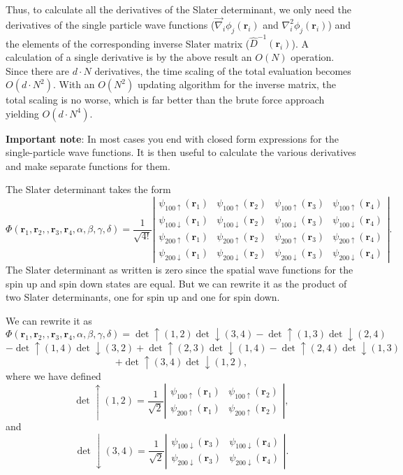 \documentclass[%
oneside,                 %
final,                   %
10pt]{article}
\begin{document}
Thus, to calculate all the derivatives of the Slater determinant, we
only need the derivatives of the single particle  wave functions
($\vec\nabla_i \phi_j(\mathbf{r}_i)$ and $\nabla^2_i \phi_j(\mathbf{r}_i)$)
and the elements of the corresponding inverse Slater matrix ($\hat{D}^{-1}(\mathbf{r}_i)$). A calculation of a single derivative is by the
above result an $O(N)$ operation. Since there are $d\cdot N$
derivatives, the time scaling of the total evaluation becomes
$O(d\cdot N^2)$. With an $O(N^2)$ updating algorithm for the
inverse matrix, the total scaling is no worse, which is far better
than the brute force approach yielding $O(d\cdot N^4)$.

\textbf{Important note}: In most cases you end with closed form expressions for the single-particle  wave functions. It is then useful to calculate the various derivatives and make separate functions
for them.

The Slater determinant takes the form  
\[
   \Phi(\mathbf{r}_1,\mathbf{r}_2,,\mathbf{r}_3,\mathbf{r}_4, \alpha,\beta,\gamma,\delta)=\frac{1}{\sqrt{4!}}
\left| \begin{array}{cccc} \psi_{100\uparrow}(\mathbf{r}_1)& \psi_{100\uparrow}(\mathbf{r}_2)& \psi_{100\uparrow}(\mathbf{r}_3)&\psi_{100\uparrow}(\mathbf{r}_4) \\
\psi_{100\downarrow}(\mathbf{r}_1)& \psi_{100\downarrow}(\mathbf{r}_2)& \psi_{100\downarrow}(\mathbf{r}_3)&\psi_{100\downarrow}(\mathbf{r}_4) \\
\psi_{200\uparrow}(\mathbf{r}_1)& \psi_{200\uparrow}(\mathbf{r}_2)& \psi_{200\uparrow}(\mathbf{r}_3)&\psi_{200\uparrow}(\mathbf{r}_4) \\
\psi_{200\downarrow}(\mathbf{r}_1)& \psi_{200\downarrow}(\mathbf{r}_2)& \psi_{200\downarrow}(\mathbf{r}_3)&\psi_{200\downarrow}(\mathbf{r}_4) \end{array} \right|.
\]
The Slater determinant as written is zero since the spatial wave functions for the spin up and spin down 
states are equal.  
But we can rewrite it as the product of two Slater determinants, one for spin up and one for spin down.

We can rewrite it as 
\[
   \Phi(\mathbf{r}_1,\mathbf{r}_2,,\mathbf{r}_3,\mathbf{r}_4, \alpha,\beta,\gamma,\delta)=\det\uparrow(1,2)\det\downarrow(3,4)-\det\uparrow(1,3)\det\downarrow(2,4)
\]
\[
-\det\uparrow(1,4)\det\downarrow(3,2)+\det\uparrow(2,3)\det\downarrow(1,4)-\det\uparrow(2,4)\det\downarrow(1,3)
\]
\[
+\det\uparrow(3,4)\det\downarrow(1,2),
\]
where we have defined
\[
\det\uparrow(1,2)=\frac{1}{\sqrt{2}}\left| \begin{array}{cc} \psi_{100\uparrow}(\mathbf{r}_1)& \psi_{100\uparrow}(\mathbf{r}_2)\\
\psi_{200\uparrow}(\mathbf{r}_1)& \psi_{200\uparrow}(\mathbf{r}_2) \end{array} \right|,
\]
and 
\[
\det\downarrow(3,4)=\frac{1}{\sqrt{2}}\left| \begin{array}{cc} \psi_{100\downarrow}(\mathbf{r}_3)& \psi_{100\downarrow}(\mathbf{r}_4)\\
\psi_{200\downarrow}(\mathbf{r}_3)& \psi_{200\downarrow}(\mathbf{r}_4) \end{array} \right|.
\]
\end{document}
